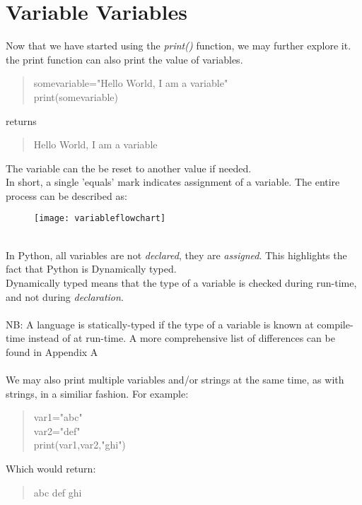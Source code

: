 \section{Variable Variables}
Now that we have started using the \emph{print()} function, we may further explore it.\\
the print function can also print the value of variables.
\begin{quote}
somevariable="Hello World, I am a variable"\\
print(somevariable)
\end{quote}
returns
\begin{quote}
Hello World, I am a variable
\end{quote}
The variable can the be reset to another value if needed.\\ In short, a single 'equals' mark indicates assignment of a variable.
The entire process can be described as: 
\begin{figure}[h]
\texttt{[image: variableflowchart]}
\end{figure}
\\
In Python, all variables are not \emph{declared}, they are \emph{assigned}. This highlights the fact that Python is Dynamically typed.\\ Dynamically typed means that the type of a variable is checked during run-time, and not during \emph{declaration}. \\ \\ 
NB: A language is statically-typed if the type of a variable is known at compile-time instead of at run-time. A more comprehensive list of differences can be found in Appendix A
\\ \\

We may also print multiple variables and/or strings at the same time, as with strings, in a similiar fashion. For example:
\begin{quote}
var1="abc"\\
var2="def"\\
print(var1,var2,"ghi")
\end{quote}

Which would return:
\begin{quote}
abc def ghi
\end{quote}

